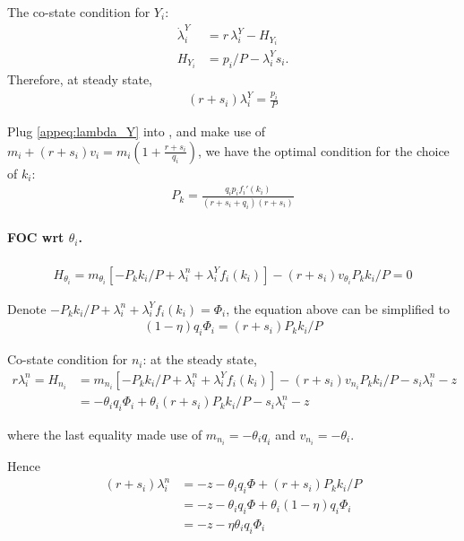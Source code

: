 \documentclass[12pt]{article} %
\theoremstyle{definition}
\begin{document}
The co-state condition for $Y_i$:
\begin{align}
     \dot{\lambda}_i^Y &= r\,\lambda_i^Y - H_{Y_i}    \label{eq:costate_Y}\\
         H_{Y_i} & =   p_i/P -\lambda_i^Ys_i. \label{eq:H_Yi}
\end{align}
Therefore, at steady state, 
\begin{align}
    (r+s_i)\lambda^Y_i = \frac{p_i}{P}  \label{appeq:lambda_Y}
\end{align}

Plug  \eqref{appeq:lambda_Y} into \label{eq:H_ki},  and make use of $m_i+(r+s_i)v_i = m_i (1+  \frac{r+s_i}{q_i}  )$, we have the optimal condition for the choice of $k_i$:
\begin{align}
P_k =\frac{q_ip_i f_i'(k_i)}{(r+s_i+q_i)(r+s_i)} 
\end{align}







\paragraph{FOC wrt $\theta_i$.}

\begin{align}
    H_{\theta_i} = m_{\theta_i} [-P_kk_i/P +\lambda^n_i +\lambda^Y_i f_i(k_i)   ] - (r+s_i)v_{\theta_i}P_kk_i/P =0
\end{align}


Denote $-P_kk_i/P +\lambda^n_i +\lambda^Y_i f_i(k_i)  =\Phi_i$, the equation above can be simplified to 
\begin{align}
    (1-\eta) q_i \Phi_i = (r+s_i) P_kk_i/P  \label{appeq:H_theta}
\end{align}



Co-state condition for $n_i$: at the steady state,
\begin{align}
    r\lambda^n_i = H_{n_i}& = m_{n_i} [-P_kk_i/P+\lambda^n_i + \lambda^Y_i f_i(k_i) ]  - (r+s_i)v_{n_i}P_kk_i/P  -s_i\lambda^n_i -z\\
     & = -\theta_iq_i\Phi_i  + \theta_i(r+s_i)P_kk_i/P - s_i\lambda^n_i -z
\end{align}

where the last equality made use of $m_{n_i} = -\theta_iq_i $ and $v_{n_i}=-\theta_i$.

Hence
\begin{align}
    (r+s_i)\lambda^n_i &= -z -\theta_iq_i\Phi+ (r+s_i)P_kk_i/P  \\
    & = -z-\theta_iq_i\Phi +\theta_i(1-\eta)q_i\Phi_i \\
    & = -z -\eta\theta_iq_i \Phi_i  \label{appeq:lambda_n}
\end{align}
\end{document}
